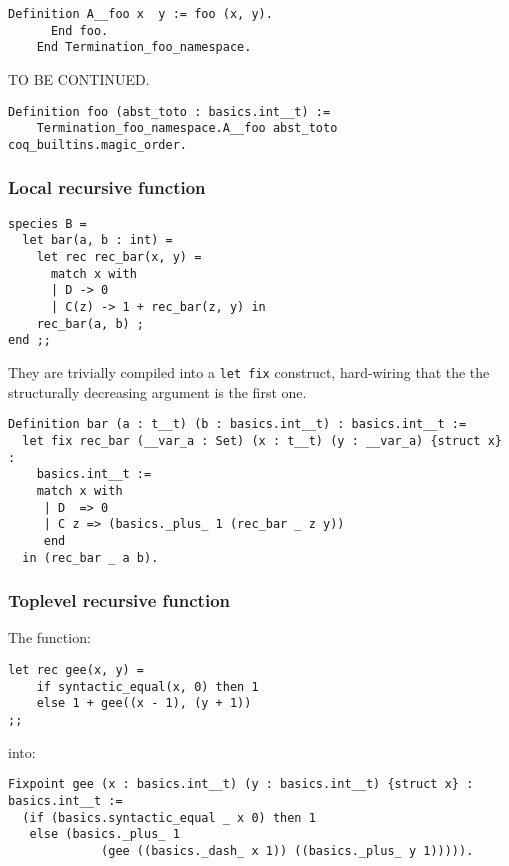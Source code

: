 {\footnotesize
\begin{lstlisting}[language=MyCoq]
      Definition A__foo x  y := foo (x, y).
      End foo.
    End Termination_foo_namespace.
\end{lstlisting}
}

TO BE CONTINUED.

{\footnotesize
\begin{lstlisting}[language=MyCoq]
  Definition foo (abst_toto : basics.int__t) :=
    Termination_foo_namespace.A__foo abst_toto coq_builtins.magic_order.
\end{lstlisting}
}


\subsubsection{Local recursive function}
{\footnotesize
\begin{lstlisting}
species B =
  let bar(a, b : int) =
    let rec rec_bar(x, y) =
      match x with
      | D -> 0
      | C(z) -> 1 + rec_bar(z, y) in
    rec_bar(a, b) ;
end ;;
\end{lstlisting}
}
They are trivially compiled into a {\tt let fix} construct,
hard-wiring that the the structurally decreasing argument is the first one.
{\footnotesize
\begin{lstlisting}[language=MyCoq]
Definition bar (a : t__t) (b : basics.int__t) : basics.int__t :=
  let fix rec_bar (__var_a : Set) (x : t__t) (y : __var_a) {struct x} :
    basics.int__t :=
    match x with
     | D  => 0
     | C z => (basics._plus_ 1 (rec_bar _ z y))
     end
  in (rec_bar _ a b).
\end{lstlisting}
}


\subsubsection{Toplevel recursive function}
The function:
{\footnotesize
\begin{lstlisting}
let rec gee(x, y) =
    if syntactic_equal(x, 0) then 1
    else 1 + gee((x - 1), (y + 1))
;;
\end{lstlisting}
}

\noindent into:

{\footnotesize
\begin{lstlisting}[language=MyCoq]
Fixpoint gee (x : basics.int__t) (y : basics.int__t) {struct x} : basics.int__t :=
  (if (basics.syntactic_equal _ x 0) then 1
   else (basics._plus_ 1
             (gee ((basics._dash_ x 1)) ((basics._plus_ y 1))))).
\end{lstlisting}
}

